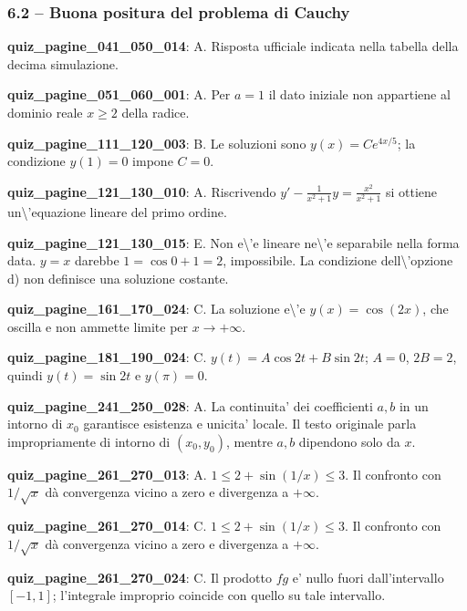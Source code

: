 \documentclass[11pt,a4paper]{article}
\newcounter{quiz}
\begin{document}
\subsubsection*{6.2 -- Buona positura del problema di Cauchy}
\noindent\textbf{quiz\_pagine\_041\_050\_014}: A. Risposta ufficiale indicata nella tabella della decima simulazione.\par\medskip
\noindent\textbf{quiz\_pagine\_051\_060\_001}: A. Per $a=1$ il dato iniziale non appartiene al dominio reale $x\ge 2$ della radice.\par\medskip
\noindent\textbf{quiz\_pagine\_111\_120\_003}: B. Le soluzioni sono $y(x)=Ce^{4x/5}$; la condizione $y(1)=0$ impone $C=0$.\par\medskip
\noindent\textbf{quiz\_pagine\_121\_130\_010}: A. Riscrivendo $y'-\frac{1}{x^2+1}y=\frac{x^2}{x^2+1}$ si ottiene un\textbackslash{}'equazione lineare del primo ordine.\par\medskip
\noindent\textbf{quiz\_pagine\_121\_130\_015}: E. Non e\textbackslash{}'e lineare ne\textbackslash{}'e separabile nella forma data. $y=x$ darebbe $1=\cos0+1=2$, impossibile. La condizione dell\textbackslash{}'opzione d) non definisce una soluzione costante.\par\medskip
\noindent\textbf{quiz\_pagine\_161\_170\_024}: C. La soluzione e\textbackslash{}'e $y(x)=\cos(2x)$, che oscilla e non ammette limite per $x\to+\infty$.\par\medskip
\noindent\textbf{quiz\_pagine\_181\_190\_024}: C. $y(t)=A\cos2t+B\sin2t$; $A=0$, $2B=2$, quindi $y(t)=\sin2t$ e $y(\pi)=0$.\par\medskip
\noindent\textbf{quiz\_pagine\_241\_250\_028}: A. La continuita' dei coefficienti $a,b$ in un intorno di $x_0$ garantisce esistenza e unicita' locale. Il testo originale parla impropriamente di intorno di $(x_0,y_0)$, mentre $a,b$ dipendono solo da $x$.\par\medskip
\noindent\textbf{quiz\_pagine\_261\_270\_013}: A. $1\leq2+\sin(1/x)\leq3$. Il confronto con $1/\sqrt{x}$ dà convergenza vicino a zero e divergenza a $+\infty$.\par\medskip
\noindent\textbf{quiz\_pagine\_261\_270\_014}: C. $1\leq2+\sin(1/x)\leq3$. Il confronto con $1/\sqrt{x}$ dà convergenza vicino a zero e divergenza a $+\infty$.\par\medskip
\noindent\textbf{quiz\_pagine\_261\_270\_024}: C. Il prodotto $fg$ e' nullo fuori dall'intervallo $[-1,1]$; l'integrale improprio coincide con quello su tale intervallo.\par\medskip
\end{document}
